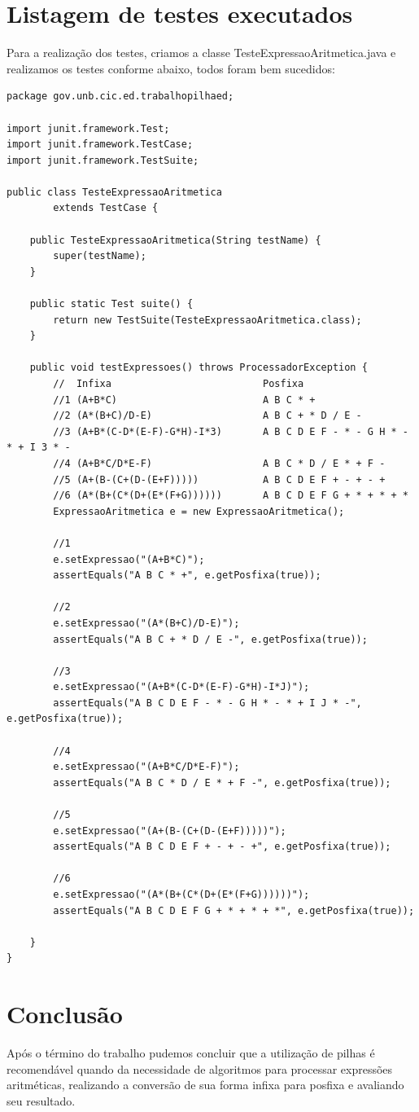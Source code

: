 \documentclass[a4paper,11pt]{article}
\begin{document}
\section{Listagem de testes executados}
Para a realização dos testes, criamos a classe TesteExpressaoAritmetica.java e realizamos os testes conforme abaixo, todos foram bem sucedidos:
\begin{lstlisting}
package gov.unb.cic.ed.trabalhopilhaed;

import junit.framework.Test;
import junit.framework.TestCase;
import junit.framework.TestSuite;

public class TesteExpressaoAritmetica
        extends TestCase {

    public TesteExpressaoAritmetica(String testName) {
        super(testName);
    }

    public static Test suite() {
        return new TestSuite(TesteExpressaoAritmetica.class);
    }

    public void testExpressoes() throws ProcessadorException {
        //  Infixa                          Posfixa
        //1 (A+B*C)                         A B C * +
        //2 (A*(B+C)/D-E)                   A B C + * D / E -
        //3 (A+B*(C-D*(E-F)-G*H)-I*3)       A B C D E F - * - G H * - * + I 3 * -
        //4 (A+B*C/D*E-F)                   A B C * D / E * + F -
        //5 (A+(B-(C+(D-(E+F)))))           A B C D E F + - + - +
        //6 (A*(B+(C*(D+(E*(F+G))))))       A B C D E F G + * + * + *
        ExpressaoAritmetica e = new ExpressaoAritmetica();
        
        //1
        e.setExpressao("(A+B*C)");
        assertEquals("A B C * +", e.getPosfixa(true));
        
        //2
        e.setExpressao("(A*(B+C)/D-E)");
        assertEquals("A B C + * D / E -", e.getPosfixa(true));
        
        //3
        e.setExpressao("(A+B*(C-D*(E-F)-G*H)-I*J)");
        assertEquals("A B C D E F - * - G H * - * + I J * -", e.getPosfixa(true));
        
        //4
        e.setExpressao("(A+B*C/D*E-F)");
        assertEquals("A B C * D / E * + F -", e.getPosfixa(true));
        
        //5
        e.setExpressao("(A+(B-(C+(D-(E+F)))))");
        assertEquals("A B C D E F + - + - +", e.getPosfixa(true));
        
        //6
        e.setExpressao("(A*(B+(C*(D+(E*(F+G))))))");
        assertEquals("A B C D E F G + * + * + *", e.getPosfixa(true));                
        
    }
}

\end{lstlisting}

\section{Conclusão}
Após o término do trabalho pudemos concluir que a utilização de pilhas é recomendável quando da necessidade de algoritmos para processar expressões aritméticas, realizando a conversão de sua forma infixa para posfixa e avaliando seu resultado.
\end{document}

